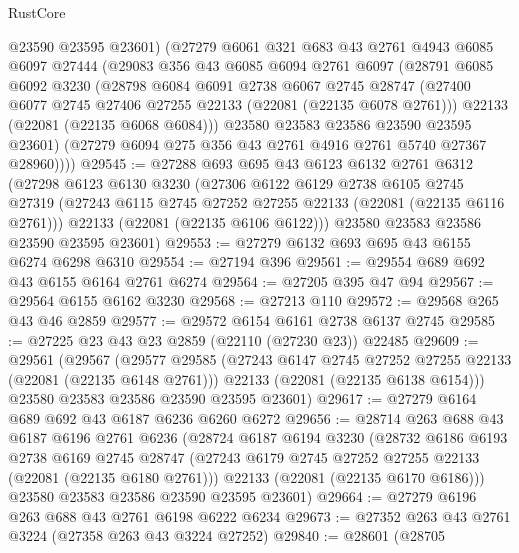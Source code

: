 \begin{lexlean}{RustCore}
\begin{coremodule}
        @23590
        @23595
        @23601)
      (@27279
        @6061
        @321
        @683
        @43
        @2761
        @4943
        @6085
        @6097
        @27444
        (@29083
          @356
          @43
          @6085
          @6094
          @2761
          @6097
          (@28791
            @6085
            @6092
            @3230
            (@28798
              @6084
              @6091
              @2738
              @6067
              @2745
              @28747
              (@27400 @6077 @2745 @27406 @27255 @22133 (@22081 (@22135 @6078 @2761)))
              @22133
              (@22081 (@22135 @6068 @6084)))
            @23580
            @23583
            @23586
            @23590
            @23595
            @23601)
          (@27279 @6094 @275 @356 @43 @2761 @4916 @2761 @5740 @27367 @28960))))
@29545 := @27288
    @693
    @695
    @43
    @6123
    @6132
    @2761
    @6312
    (@27298
      @6123
      @6130
      @3230
      (@27306
        @6122
        @6129
        @2738
        @6105
        @2745
        @27319
        (@27243 @6115 @2745 @27252 @27255 @22133 (@22081 (@22135 @6116 @2761)))
        @22133
        (@22081 (@22135 @6106 @6122)))
      @23580
      @23583
      @23586
      @23590
      @23595
      @23601)
@29553 := @27279 @6132 @693 @695 @43 @6155 @6274 @6298 @6310
@29554 := @27194 @396
@29561 := @29554 @689 @692 @43 @6155 @6164 @2761 @6274
@29564 := @27205 @395 @47 @94
@29567 := @29564 @6155 @6162 @3230
@29568 := @27213 @110
@29572 := @29568 @265 @43 @46 @2859
@29577 := @29572 @6154 @6161 @2738 @6137 @2745
@29585 := @27225 @23 @43 @23 @2859 (@22110 (@27230 @23)) @22485
@29609 := @29561
    (@29567
      (@29577
        @29585
        (@27243 @6147 @2745 @27252 @27255 @22133 (@22081 (@22135 @6148 @2761)))
        @22133
        (@22081 (@22135 @6138 @6154)))
      @23580
      @23583
      @23586
      @23590
      @23595
      @23601)
@29617 := @27279 @6164 @689 @692 @43 @6187 @6236 @6260 @6272
@29656 := @28714
    @263
    @688
    @43
    @6187
    @6196
    @2761
    @6236
    (@28724
      @6187
      @6194
      @3230
      (@28732
        @6186
        @6193
        @2738
        @6169
        @2745
        @28747
        (@27243 @6179 @2745 @27252 @27255 @22133 (@22081 (@22135 @6180 @2761)))
        @22133
        (@22081 (@22135 @6170 @6186)))
      @23580
      @23583
      @23586
      @23590
      @23595
      @23601)
@29664 := @27279 @6196 @263 @688 @43 @2761 @6198 @6222 @6234
@29673 := @27352 @263 @43 @2761 @3224 (@27358 @263 @43 @3224 @27252)
@29840 := @28601
    (@28705

\end{coremodule}
\end{lexlean}
